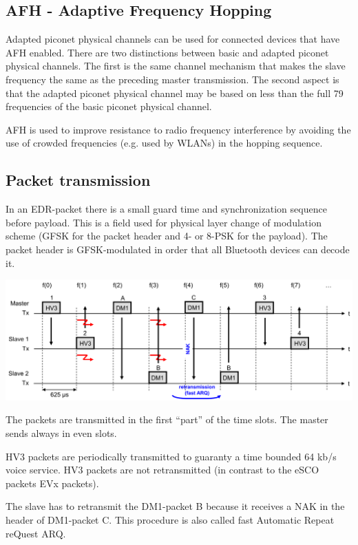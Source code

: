 \subsection{AFH - Adaptive Frequency Hopping}
	Adapted piconet physical channels can be used for connected devices that have AFH enabled. There are 
	two distinctions between basic and adapted piconet physical channels. The first is the same channel 
	mechanism that makes the slave frequency the same as the preceding master transmission. The second aspect 
	is that the adapted piconet physical channel may be based on less than the full 79 frequencies of the 
	basic piconet physical channel.
	
	AFH is used to improve resistance to radio frequency interference by avoiding the use of crowded frequencies
	(e.g. used by WLANs) in the hopping sequence.
	
\subsection{Packet transmission}
	In an EDR-packet there is a small guard time and synchronization sequence before payload. This is 
	a field used for physical layer change of modulation scheme (GFSK for the packet header and 4- or 8-PSK 
	for the payload). The packet header is GFSK-modulated in order that all Bluetooth devices can decode it.
	
	\begin{minipage}{16cm}
		\includegraphics[width=16cm]{./bilder/bt-packet-transmission.png} 
	\end{minipage}

	The packets are transmitted in the first “part” of the time slots. The master sends always 
	in even slots. 

	HV3 packets are periodically transmitted to guaranty a time bounded 64 kb/s voice 
	service. HV3 packets are not retransmitted (in contrast to the eSCO packets EVx 
	packets). 

	The slave has to retransmit the DM1-packet B because it receives a NAK in the header 
	of DM1-packet C. This procedure is also called fast Automatic Repeat reQuest ARQ. 

	
	